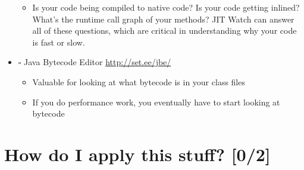 \documentclass[11pt]{article}
\begin{document}
\begin{itemize}
\begin{itemize}
\item Is your code being compiled to native code? Is your code getting inlined? What's the runtime call graph of your methods? JIT Watch can answer all of these questions, which are critical in understanding why your code is fast or slow.
\end{itemize}

\item $\square$ Java Bytecode Editor \url{http://set.ee/jbe/}

\begin{itemize}
\item Valuable for looking at what bytecode is in your class files

\item If you do performance work, you eventually have to start looking at bytecode
\end{itemize}
\end{itemize}
\section{How do I apply this stuff? [0/2]}
\label{sec:orgheadline9}
\end{document}
